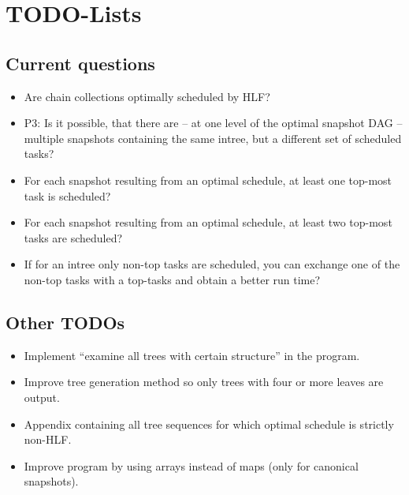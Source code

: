 \documentclass[a4paper, 11pt]{report}
\begin{document}
\chapter{TODO-Lists}
\label{chap:todo}

\section{Current questions}
\label{chap:current-questions}

\begin{itemize}
\item Are chain collections optimally scheduled by HLF?
\item P3: Is it possible, that there are -- at one level of the optimal snapshot DAG -- multiple snapshots containing the same intree, but a different set of scheduled tasks?
\item For each snapshot resulting from an optimal schedule, at least one top-most task is scheduled?
\item For each snapshot resulting from an optimal schedule, at least two top-most tasks are scheduled?
\item If for an intree only non-top tasks are scheduled, you can exchange one of the non-top tasks with a top-tasks and obtain a better run time?
\end{itemize}

\section{Other TODOs}

\begin{itemize}
\item Implement ``examine all trees with certain structure'' in the program.
\item Improve tree generation method so only trees with four or more leaves are output.
\item Appendix containing all tree sequences for which optimal schedule is strictly non-HLF.
\item Improve program by using arrays instead of maps (only for canonical snapshots).  
\end{itemize}

%
%
%

%
%
%
\end{document}
